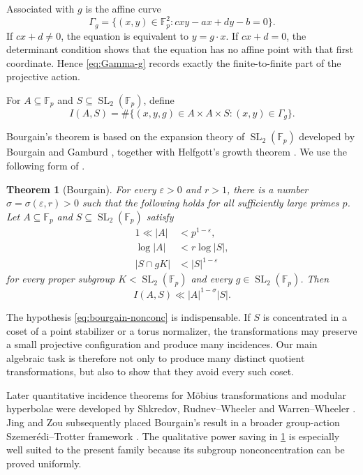 \documentclass[11pt,reqno]{amsart}
\numberwithin{equation}{section}
\newtheorem{theorem}{Theorem}[section]
\theoremstyle{definition}
\theoremstyle{remark}
\newcommand{\F}{\mathbb F}
\newcommand{\SL}{\operatorname{SL}}
\begin{document}
Associated with $g$ is the affine curve
\begin{equation}\label{eq:Gamma-g}
  \Gamma_g
  =\{(x,y)\in\F_p^2:cxy-ax+dy-b=0\}.
\end{equation}
If $cx+d\ne0$, the equation is equivalent to $y=g\cdot x$.  If $cx+d=0$, the determinant condition shows that the equation has no affine point with that first coordinate.  Hence \eqref{eq:Gamma-g} records exactly the finite-to-finite part of the projective action.

For $A\subseteq\F_p$ and $S\subseteq\SL_2(\F_p)$, define
\begin{equation}\label{eq:incidence-def}
  I(A,S)
  =\#\{(x,y,g)\in A\times A\times S:(x,y)\in\Gamma_g\}.
\end{equation}

Bourgain's theorem is based on the expansion theory of $\SL_2(\F_p)$ developed by Bourgain and Gamburd \cite{BourgainGamburd2008}, together with Helfgott's growth theorem \cite{Helfgott2008}.  We use the following form of \cite[Proposition~1]{Bourgain2012}.

\begin{theorem}[Bourgain]\label{thm:bourgain}
For every $\varepsilon>0$ and $r>1$, there is a number $\sigma=\sigma(\varepsilon,r)>0$ such that the following holds for all sufficiently large primes $p$.  Let $A\subseteq\F_p$ and $S\subseteq\SL_2(\F_p)$ satisfy
\begin{align}
  1\ll |A|&<p^{1-\varepsilon},\label{eq:bourgain-size-A}\\
  \log|A|&<r\log|S|,\label{eq:bourgain-size-S}\\
  |S\cap gK|&<|S|^{1-\varepsilon}\label{eq:bourgain-nonconc}
\end{align}
for every proper subgroup $K<\SL_2(\F_p)$ and every $g\in\SL_2(\F_p)$.  Then
\begin{equation}\label{eq:bourgain-conclusion}
  I(A,S)\ll |A|^{1-\sigma}|S|.
\end{equation}
\end{theorem}

The hypothesis \eqref{eq:bourgain-nonconc} is indispensable.  If $S$ is concentrated in a coset of a point stabilizer or a torus normalizer, the transformations may preserve a small projective configuration and produce many incidences.  Our main algebraic task is therefore not only to produce many distinct quotient transformations, but also to show that they avoid every such coset.

Later quantitative incidence theorems for M\"obius transformations and modular hyperbolae were developed by Shkredov, Rudnev--Wheeler and Warren--Wheeler \cite{Shkredov2021,RudnevWheeler2022,WarrenWheeler2023}.  Jing and Zou subsequently placed Bourgain's result in a broader group-action Szemer\'edi--Trotter framework \cite{JingZou2024}.  The qualitative power saving in \cref{thm:bourgain} is especially well suited to the present family because its subgroup nonconcentration can be proved uniformly.
\end{document}

